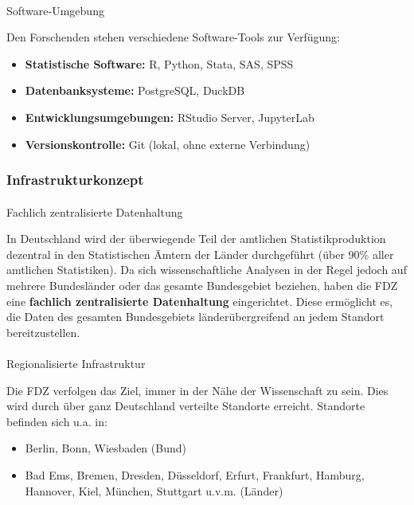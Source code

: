 \documentclass[
  ngerman,
  10pt,
  twocolumn]{article}
\makeatletter
\let\oldparagraph\paragraph
\renewcommand{\paragraph}{
    \@ifstar
      \xxxParagraphStar
      \xxxParagraphNoStar
  }
\newcommand{\xxxParagraphStar}[1]{\oldparagraph*{#1}\mbox{}}
\newcommand{\xxxParagraphNoStar}[1]{\oldparagraph{#1}\mbox{}}
\providecommand{\tightlist}{%
  \setlength{\itemsep}{0pt}\setlength{\parskip}{0pt}}
\makeatother
\begin{document}
\paragraph{Software-Umgebung}\label{software-umgebung}

Den Forschenden stehen verschiedene Software-Tools zur Verfügung:

\begin{itemize}
\tightlist
\item
  \textbf{Statistische Software:} R, Python, Stata, SAS, SPSS
\item
  \textbf{Datenbanksysteme:} PostgreSQL, DuckDB
\item
  \textbf{Entwicklungsumgebungen:} RStudio Server, JupyterLab
\item
  \textbf{Versionskontrolle:} Git (lokal, ohne externe Verbindung)
\end{itemize}

\subsubsection{Infrastrukturkonzept}\label{infrastrukturkonzept}

\paragraph{Fachlich zentralisierte
Datenhaltung}\label{fachlich-zentralisierte-datenhaltung}

In Deutschland wird der überwiegende Teil der amtlichen
Statistikproduktion dezentral in den Statistischen Ämtern der Länder
durchgeführt (über 90\% aller amtlichen Statistiken). Da sich
wissenschaftliche Analysen in der Regel jedoch auf mehrere Bundesländer
oder das gesamte Bundesgebiet beziehen, haben die FDZ eine
\textbf{fachlich zentralisierte Datenhaltung} eingerichtet. Diese
ermöglicht es, die Daten des gesamten Bundesgebiets länderübergreifend
an jedem Standort bereitzustellen.

\paragraph{Regionalisierte
Infrastruktur}\label{regionalisierte-infrastruktur}

Die FDZ verfolgen das Ziel, immer in der Nähe der Wissenschaft zu sein.
Dies wird durch über ganz Deutschland verteilte Standorte erreicht.
Standorte befinden sich u.a. in:

\begin{itemize}
\tightlist
\item
  Berlin, Bonn, Wiesbaden (Bund)
\item
  Bad Ems, Bremen, Dresden, Düsseldorf, Erfurt, Frankfurt, Hamburg,
  Hannover, Kiel, München, Stuttgart u.v.m. (Länder)
\end{itemize}
\end{document}

